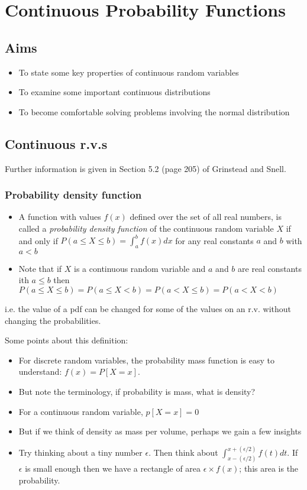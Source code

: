 \documentclass[12pt]{extbook}
\begin{document}
\chapter{Continuous Probability Functions}

\section*{Aims}
\begin{itemize}
\item To state some key properties of continuous random variables
\item To examine some important continuous distributions
\item To become comfortable solving problems involving the normal distribution
\end{itemize}


\section{Continuous r.v.s}

Further information is given in Section 5.2 (page 205) of Grinstead and Snell.

\subsection{Probability density function}

\begin{itemize}
\item A function with values $f(x)$ defined over the set of all real numbers, is called a \emph{probability density function} of the continuous random variable $X$ if and only if $P(a \leq X \leq b) = \int_{a}^{b} f(x) dx$ for any real constants $a$ and $b$ with $a < b$
\item Note that if $X$ is a continuous random variable and $a$ and $b$ are real constants ith $a \leq b$ then $P(a \leq X \leq b) = P(a \leq X < b) = P(a < X \leq b) = P(a < X < b)$
\end{itemize}
i.e. the value of a pdf can be changed for some of the values on an r.v. without changing the probabilities.


Some points about this definition:
\begin{itemize}
\item For discrete random variables, the probability mass function is easy to understand: $f(x) = P[X=x]$.
\item But note the terminology, if probability is mass, what is density?
\item For a continuous random variable, $p[X=x]=0$
\item But if we think of density as mass per volume, perhaps we gain a few insights
\item Try thinking about a tiny number $\epsilon$.  Then think about $\int_{x-(\epsilon/2)}^{x+(\epsilon/2)} f(t)dt$.   If $\epsilon$ is small enough then we have a rectangle of area $\epsilon \times f(x)$; this area is the probability.
\end{itemize}
\end{document}
